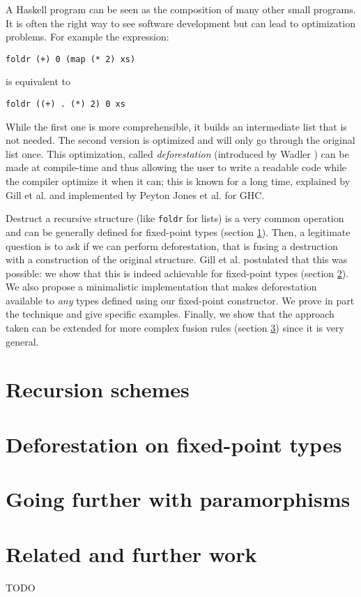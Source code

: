 \documentclass[format=sigplan]{acmart}
\newcommand{\minline}[1]{\texttt{#1}}
\begin{document}
A Haskell program can be seen as the composition of many other small programs. It is often the right way to see software development but can lead to optimization problems. For example the expression:
\begin{verbatim}
foldr (+) 0 (map (* 2) xs)
\end{verbatim}
is equivalent to
\begin{verbatim}
foldr ((+) . (*) 2) 0 xs
\end{verbatim}

\noindent While the first one is more comprehensible, it builds an intermediate list that is not needed. The second version is optimized and will only go through the original list once.
This optimization, called \emph{deforestation} (introduced by Wadler \cite{WADLER1990231}) can be made at compile-time and thus allowing the user to write a readable code while the compiler optimize it when it can; this is known for a long time, explained by Gill et al. \cite{Gill:1993:SCD:165180.165214} and implemented by Peyton Jones et al. \cite{pbr} for GHC.

Destruct a recursive structure (like \minline{foldr} for lists) is a very common operation and can be generally defined for fixed-point types (section \ref{sec:recschemes}). Then, a legitimate question is to ask if we can perform deforestation, that is fusing a destruction with a construction of the original structure. Gill et al. \cite{Gill:1993:SCD:165180.165214} postulated that this was possible: we show that this is indeed achievable for fixed-point types (section \ref{sec:rectypes}). We also propose a minimalistic implementation that makes deforestation available to \emph{any} types defined using our fixed-point constructor. We prove in part the technique and give specific examples.
Finally, we show that the approach taken can be extended for more complex fusion rules (section \ref{sec:para}) since it is very general.

\section{Recursion schemes}
\label{sec:recschemes}


\section{Deforestation on fixed-point types}
\label{sec:rectypes}


\section{Going further with paramorphisms}
\label{sec:para}


\section{Related and further work}
\label{sec:related}


\begin{acks}
TODO
\end{acks}




\end{document}
